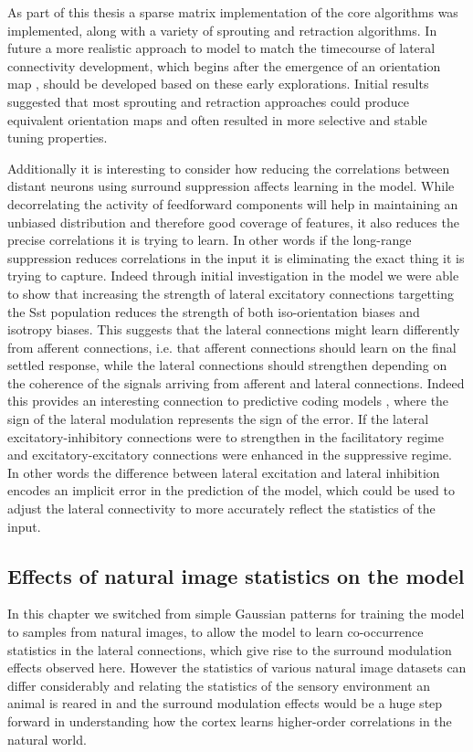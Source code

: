 As part of this thesis a sparse matrix implementation of the core
algorithms was implemented, along with a variety of sprouting and
retraction algorithms. In future a more realistic approach to model to
match the timecourse of lateral connectivity development, which begins
after the emergence of an orientation map \citep{Ruthazer1996}, should
be developed based on these early explorations. Initial results
suggested that most sprouting and retraction approaches could produce
equivalent orientation maps and often resulted in more selective and
stable tuning properties.

Additionally it is interesting to consider how reducing the
correlations between distant neurons using surround suppression
affects learning in the model. While decorrelating the activity of
feedforward components will help in maintaining an unbiased
distribution and therefore good coverage of features, it also reduces
the precise correlations it is trying to learn. In other words if the
long-range suppression reduces correlations in the input it is
eliminating the exact thing it is trying to capture. Indeed through
initial investigation in the model we were able to show that
increasing the strength of lateral excitatory connections targetting
the Sst population reduces the strength of both iso-orientation biases
and isotropy biases. This suggests that the lateral connections might
learn differently from afferent connections, i.e. that afferent
connections should learn on the final settled response, while the
lateral connections should strengthen depending on the coherence of
the signals arriving from afferent and lateral connections. Indeed
this provides an interesting connection to predictive coding models
\citep{Rao1999}, where the sign of the lateral modulation represents
the sign of the error. If the lateral excitatory-inhibitory
connections were to strengthen in the facilitatory regime and
excitatory-excitatory connections were enhanced in the suppressive
regime. In other words the difference between lateral excitation and
lateral inhibition encodes an implicit error in the prediction of the
model, which could be used to adjust the lateral connectivity to more
accurately reflect the statistics of the input.

\subsection{Effects of natural image statistics on the model}

In this chapter we switched from simple Gaussian patterns for training
the model to samples from natural images, to allow the model to learn
co-occurrence statistics in the lateral connections, which give rise
to the surround modulation effects observed here. However the
statistics of various natural image datasets can differ considerably
and relating the statistics of the sensory environment an animal is
reared in and the surround modulation effects would be a huge step
forward in understanding how the cortex learns higher-order
correlations in the natural world.

